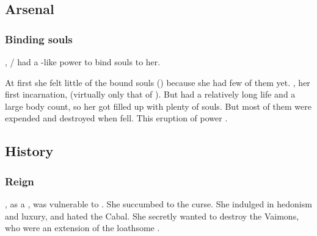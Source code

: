 \subsection{Arsenal}





\subsubsection{Binding souls}
\index{\carcer!\Belzir}
, \Shiaraid{}/\Belzir{} had a \sephirah-like power to bind souls to her. 

At first she felt little of the bound souls () because she had few of them yet. 
\Delphine{}, her first incarnation,  (virtually only that of \Eryal). 
But \Belzir{} had a relatively long life and a large body count, so her \carcer{} got filled up with plenty of souls. 
But most of them were expended and destroyed when \Belzir{} fell. 
This eruption of power . 









\subsection{History}
\subsubsection{Reign}
\Belzir, as a \sathariah, was vulnerable to . 
She succumbed to the curse. 
She indulged in hedonism and luxury, and hated the Cabal. 
She secretly wanted to destroy the Vaimons, who were an extension of the loathsome \banes. 







